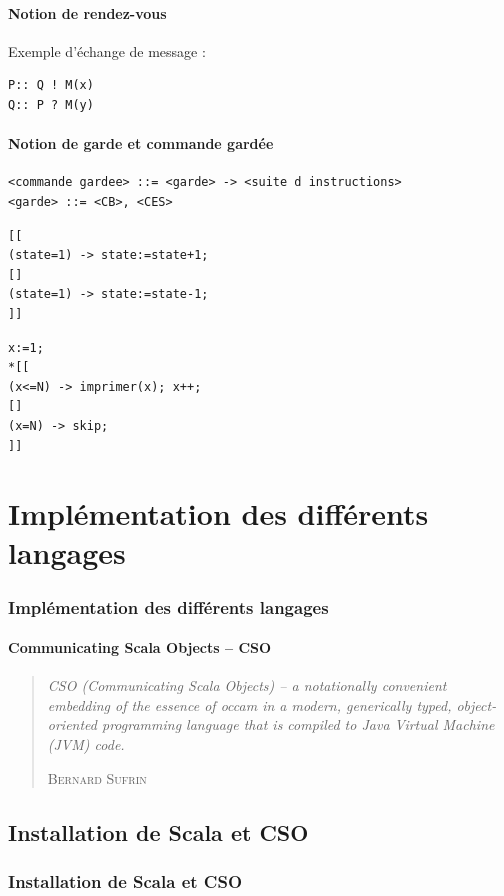 \documentclass[slidetop,11pt]{beamer}
\begin{document}
\begin{frame} [containsverbatim]
\framesubtitle{Notion de rendez-vous}
Exemple d'échange de message :
\begin{lstlisting}[frame=trBL]
P:: Q ! M(x)
Q:: P ? M(y)
\end{lstlisting}
\end{frame}

\begin{frame} [containsverbatim]
\framesubtitle{Notion de garde et commande gardée}

 \begin{lstlisting}[frame=trBL]
<commande gardee> ::= <garde> -> <suite d instructions>
<garde> ::= <CB>, <CES>
\end{lstlisting}

\begin{lstlisting}[frame=trBL,title={Sélective}]
[[
(state=1) -> state:=state+1;
[]
(state=1) -> state:=state-1;
]]
\end{lstlisting}

\begin{lstlisting}[frame=trBL,title={Répétitive}]
x:=1;
*[[
(x<=N) -> imprimer(x); x++;
[]
(x=N) -> skip;
]]
\end{lstlisting}
\end{frame}

\section{Implémentation des différents langages}
\begin{frame} 
  \frametitle{Implémentation des différents langages}
  \framesubtitle{Communicating Scala Objects – CSO}
  \begin{quotation}
     \textit{\og CSO (Communicating Scala Objects) – a notationally convenient embedding of the essence of occam in a modern, generically typed, object-oriented programming language that is compiled to Java Virtual Machine (JVM) code.\fg}
   \begin{flushright}
\textsc{Bernard Sufrin}
\end{flushright}
\end{quotation}   
\end{frame}

\subsection{Installation de Scala et CSO}
\begin{frame} 
\frametitle{Installation de Scala et CSO}

\end{frame}
\end{document}
